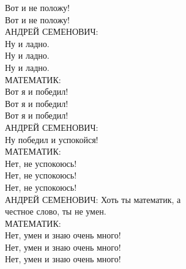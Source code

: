           \hspace{2cm}Вот и не положу! \\
          \hspace{2cm}Вот и не положу! \\
    \hspace{1cm}АНДРЕЙ СЕМЕНОВИЧ: \\
          \hspace{2cm}Ну и ладно. \\
          \hspace{2cm}Ну и ладно. \\
          \hspace{2cm}Ну и ладно. \\
    \hspace{1cm}МАТЕМАТИК: \\
          \hspace{2cm}Вот я и победил! \\
          \hspace{2cm}Вот я и победил! \\
          \hspace{2cm}Вот я и победил! \\
    \hspace{1cm}АНДРЕЙ СЕМЕНОВИЧ: \\
          \hspace{2cm}Ну победил и успокойся! \\
    \hspace{1cm}МАТЕМАТИК: \\
          \hspace{2cm}Нет, не успокоюсь! \\
          \hspace{2cm}Нет, не успокоюсь! \\
          \hspace{2cm}Нет, не успокоюсь! \\
    \hspace{1cm}АНДРЕЙ СЕМЕНОВИЧ:  Хоть ты математик,  а \\
честное слово, ты не умен. \\
    \hspace{1cm}МАТЕМАТИК: \\
          \hspace{2cm}Нет, умен и знаю очень много! \\
          \hspace{2cm}Нет, умен и знаю очень много! \\
          \hspace{2cm}Нет, умен и знаю очень много! \\
